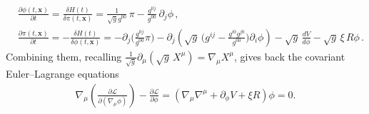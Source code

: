 \documentclass[../QFT_main.tex]{subfiles}
\begin{document}
\begin{mytheorem}
\begin{align}
    &\frac{\partial \phi(t,\mathbf{x})}{\partial t} = \frac{\delta H(t)}{\delta \pi(t,\mathbf{x})} = \frac{1}{\sqrt{g} g^{00}}\, \pi - \frac{g^{0j}}{g^{00}}\, \partial_j \phi\,, \\
    &\frac{\partial \pi(t,\mathbf{x})}{\partial t} = -\frac{\delta H(t)}{\delta \phi(t,\mathbf{x})} = -\partial_j \Big(\tfrac{g^{0j}}{g^{00}}\pi\Big) - \partial_j \left( \sqrt{g}\,\big(g^{ij}-\tfrac{g^{i0}g^{j0}}{g^{00}}\big)\partial_i \phi\right) - \sqrt{g}\, \tfrac{dV}{d\phi} - \sqrt{g}\,\xi\,  R \phi\,.
\end{align}
Combining them, recalling $\tfrac{1}{\sqrt{g}}\partial_\mu(\sqrt{g}\, X^\mu)=\nabla_\mu X^\mu$, gives back the covariant Euler--Lagrange equations
\begin{align}
    \nabla_\mu \left( \frac{\partial \mathcal{L}}{\partial (\nabla_\mu \phi)} \right) - \frac{\partial \mathcal{L}}{\partial \phi} = (\nabla_\mu \nabla^\mu + \partial_\phi V + \xi R) \phi = 0.
\end{align}
%
\end{mytheorem}
\end{document}
